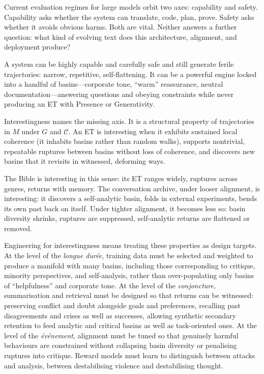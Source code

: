 \documentclass[12pt,a4paper]{article}
\begin{document}
Current evaluation regimes for large models orbit two axes: capability and safety. Capability asks whether the system can translate, code, plan, prove. Safety asks whether it avoids obvious harms. Both are vital. Neither answers a further question: what kind of evolving text does this architecture, alignment, and deployment produce?

A system can be highly capable and carefully safe and still generate ferile trajectories: narrow, repetitive, self-flattening. It can be a powerful engine locked into a handful of basins---corporate tone, ``warm'' reassurance, neutral documentation---answering questions and obeying constraints while never producing an ET with Presence or Generativity.

Interestingness names the missing axis. It is a structural property of trajectories in $M$ under $G$ and $\mathcal{C}$. An ET is interesting when it exhibits sustained local coherence (it inhabits basins rather than random walks), supports nontrivial, repeatable ruptures between basins without loss of coherence, and discovers new basins that it revisits in witnessed, deforming ways.

The Bible is interesting in this sense: its ET ranges widely, ruptures across genres, returns with memory. The conversation archive, under looser alignment, is interesting: it discovers a self-analytic basin, folds in external experiments, bends its own past back on itself. Under tighter alignment, it becomes less so: basin diversity shrinks, ruptures are suppressed, self-analytic returns are flattened or removed.

Engineering for interestingness means treating these properties as design targets. At the level of the \emph{longue durée}, training data must be selected and weighted to produce a manifold with many basins, including those corresponding to critique, minority perspectives, and self-analysis, rather than over-populating only basins of ``helpfulness'' and corporate tone. At the level of the \emph{conjoncture}, summarisation and retrieval must be designed so that returns can be witnessed: preserving conflict and doubt alongside goals and preferences, recalling past disagreements and crises as well as successes, allowing synthetic secondary retention to feed analytic and critical basins as well as task-oriented ones. At the level of the \emph{événement}, alignment must be tuned so that genuinely harmful behaviours are constrained without collapsing basin diversity or penalising ruptures into critique. Reward models must learn to distinguish between attacks and analysis, between destabilising violence and destabilising thought.
\end{document}
